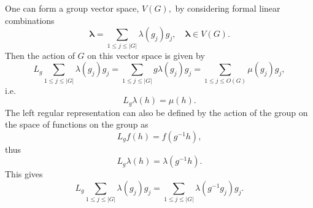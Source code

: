 \documentclass[aps,preprint]{revtex4}
\begin{document}
One can form a group vector space, $V\left( G\right) ,$ by considering
formal linear combinations 
\begin{equation}
\mathbf{\lambda}=\sum_{1\leq j\leq\left\vert G\right\vert }\lambda\left(
g_{j}\right) g_{j},\quad\mathbf{\lambda\in}V\left( G\right) .
\end{equation}
Then the action of $G$ on this vector space is given by 
\begin{equation}
L_{g}\sum_{1\leq j\leq\left\vert G\right\vert }\lambda\left( g_{j}\right)
g_{j}=\sum_{1\leq j\leq\left\vert G\right\vert }g\lambda\left( g_{j}\right)
g_{j}=\sum_{1\leq j\leq O\left( G\right) }\mu\left( g_{j}\right) g_{j},
\end{equation}
i.e. 
\begin{equation}
L_{g}\lambda\left( h\right) =\mu\left( h\right) .
\end{equation}
The left regular representation can also be defined by the action of the
group on the space of functions on the group as 
\begin{equation}
L_{g}f\left( h\right) =f\left( g^{-1}h\right) ,
\end{equation}
thus 
\begin{equation}
L_{g}\lambda\left( h\right) =\lambda\left( g^{-1}h\right) .
\end{equation}
This gives 
\begin{equation}
L_{g}\sum_{1\leq j\leq\left\vert G\right\vert }\lambda\left( g_{j}\right)
g_{j}=\sum_{1\leq j\leq\left\vert G\right\vert }\lambda\left(
g^{-1}g_{j}\right) g_{j}.
\end{equation}
\end{document}
